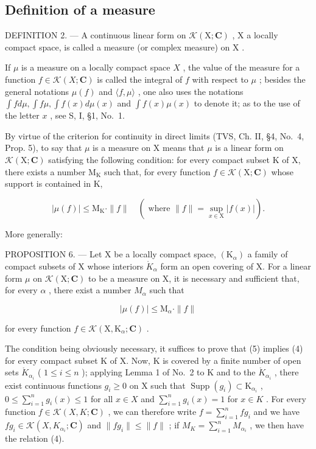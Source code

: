 \subsection{Definition of a measure}

DEFINITION 2. --- A continuous linear form on \(\mathcal{K}(\mathrm{X};\mathbf{C})\) , \(\mathrm{X}\) a locally compact space, is called a measure (or complex measure) on \(\mathrm{X}\) .

If \(\mu\) is a measure on a locally compact space \(X\) , the value of the measure for a function \(f \in \mathcal{K}(X; \mathbf{C})\) is called the integral of \(f\) with respect to \(\mu\) ; besides the general notations \(\mu(f)\) and \(\langle f, \mu \rangle\) , one also uses the notations \(\int f d\mu, \int f\mu, \int f(x) d\mu(x)\) and \(\int f(x)\mu(x)\) to denote it; as to the use of the letter \(x\) , see S, I, §1, No.~1.

By virtue of the criterion for continuity in direct limits (TVS, Ch. II, §4, No.~4, Prop. 5), to say that \(\mu\) is a measure on X means that \(\mu\) is a linear form on \(\mathcal{K}(\mathrm{X};\mathbf{C})\) satisfying the following condition: for every compact subset K of X, there exists a number \(\mathrm{M_K}\) such that, for every function \(f\in \mathcal{K}(\mathrm{X};\mathbf{C})\) whose support is contained in K,

\[
| \mu (f) | \leqslant \mathrm{M} _ {\mathrm{K}} \cdot \| f \| \quad (\text { where } \| f \| = \sup _ {x \in \mathrm{X}} | f (x) |).\tag{4}
\]

More generally:

PROPOSITION 6. --- Let X be a locally compact space, \((\mathrm{K}_{\alpha})\) a family of compact subsets of X whose interiors \(\mathring{K}_{\alpha}\) form an open covering of X. For a linear form \(\mu\) on \(\mathcal{K}(\mathrm{X};\mathbf{C})\) to be a measure on X, it is necessary and sufficient that, for every \(\alpha\) , there exist a number \(M_{\alpha}\) such that

\[
| \mu (f) | \leqslant \mathrm{M} _ {\alpha} \cdot \| f \|\tag{5}
\]

for every function \(f \in \mathcal{K}(\mathrm{X}, \mathrm{K}_{\alpha}; \mathbf{C})\) .

The condition being obviously necessary, it suffices to prove that (5) implies (4) for every compact subset K of X. Now, K is covered by a finite number of open sets \(\mathring{K}_{\alpha_{i}}\) ( \(1 \leqslant i \leqslant n\) ); applying Lemma 1 of No.~2 to K and to the \(\mathring{K}_{\alpha_{i}}\) , there exist continuous functions \(g_{i} \geqslant 0\) on X such that \(\operatorname{Supp}(g_{i}) \subset \mathrm{K}_{\alpha_{i}}\) , \(0 \leqslant \sum_{i=1}^{n} g_{i}(x) \leqslant 1\) for all \(x \in X\) and \(\sum_{i=1}^{n} g_{i}(x) = 1\) for \(x \in K\) . For every function \(f \in \mathcal{K}(X, K; \mathbf{C})\) , we can therefore write \(f = \sum_{i=1}^{n} fg_{i}\) and we have \(fg_{i} \in \mathcal{K}(X, K_{\alpha_{i}}; \mathbf{C})\) and \(\|fg_{i}\| \leqslant \|f\|\) ; if \(M_{K} = \sum_{i=1}^{n} M_{\alpha_{i}}\) , we then have the relation (4).

